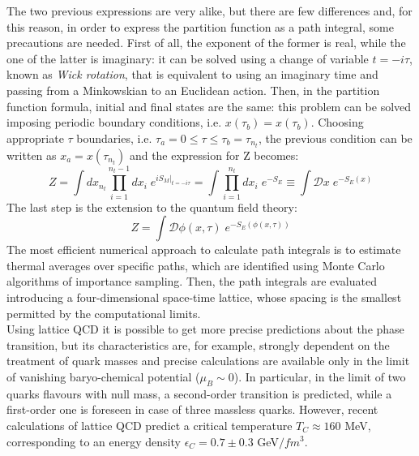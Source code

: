 The two previous expressions are very alike, but there are few differences and, for this reason, in order to express the partition function as a path integral, some precautions are needed. First of all, the exponent of the former is real, while the one of the latter is imaginary: it can be solved using a change of variable $t = -i \tau$, known as \textit{Wick rotation}, that is equivalent to using an imaginary time and passing from a Minkowskian to an Euclidean action. Then, in the partition function formula, initial and final states are the same: this problem can be solved imposing periodic boundary conditions, i.e. $x(\tau_{b}) = x(\tau_{b})$. Choosing appropriate $\tau$ boundaries, i.e. $\tau_{a} = 0 \leq \tau \leq \tau_{b} = \tau_{n_{t}}$, the previous condition can be written as $x_{a} = x(\tau_{n_{t}})$ and the expression for Z becomes:
%
\begin{equation}
 Z = \int dx_{n_{t}} \prod\limits_{i=1}^{n_{t}-1}dx_{i} \; e^{iS_{M}\Big|_{t=-i\tau}} = \int \prod\limits_{i=1}^{n_{t}}dx_{i} \; e^{-S_{E}} \equiv \int \mathcal{D}x \; e^{-S_{E}(x)}
\end{equation}
%
The last step is the extension to the quantum field theory:
%
\begin{equation}
 Z = \int \mathcal{D}\phi(x,\tau) \; e^{-S_{E}(\phi(x,\tau))}
\end{equation}
%
The most efficient numerical approach to calculate path integrals is to estimate thermal averages over specific paths, which are identified using Monte Carlo algorithms of importance sampling. Then, the path integrals are evaluated introducing a four-dimensional space-time lattice, whose spacing is the smallest permitted by the computational limits.\\
Using lattice QCD it is possible to get more precise predictions about the phase transition, but its characteristics are, for example, strongly dependent on the treatment of quark masses and precise calculations are available only in the limit of vanishing baryo-chemical potential ($\mu_{B}\sim0$). In particular, in the limit of two quarks flavours with null mass, a second-order transition is predicted, while a first-order one is foreseen in case of three massless quarks. However, recent calculations of lattice QCD predict a critical temperature $T_{C}\approx160$ MeV, corresponding to an energy density $\epsilon_{C} = 0.7 \pm 0.3$ GeV$/fm^{3}$\cite{lattice}.
%
